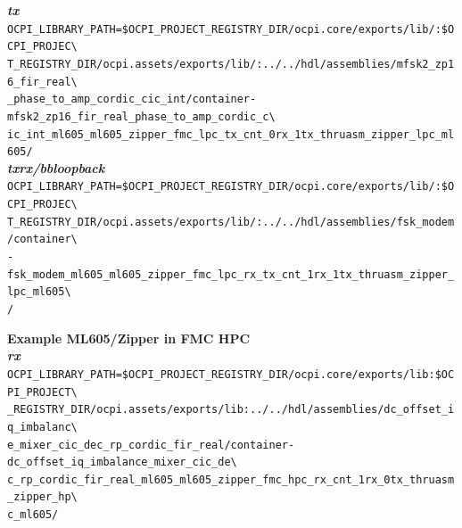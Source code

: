 \noindent\textbf{\textit{tx}}\\
\verb|OCPI_LIBRARY_PATH=$OCPI_PROJECT_REGISTRY_DIR/ocpi.core/exports/lib/:$OCPI_PROJEC\| \\
\verb|T_REGISTRY_DIR/ocpi.assets/exports/lib/:../../hdl/assemblies/mfsk2_zp16_fir_real\| \\
\verb|_phase_to_amp_cordic_cic_int/container-mfsk2_zp16_fir_real_phase_to_amp_cordic_c\| \\
\verb|ic_int_ml605_ml605_zipper_fmc_lpc_tx_cnt_0rx_1tx_thruasm_zipper_lpc_ml605/| \\

\noindent\textbf{\textit{txrx/bbloopback}}\\
\verb|OCPI_LIBRARY_PATH=$OCPI_PROJECT_REGISTRY_DIR/ocpi.core/exports/lib/:$OCPI_PROJEC\| \\
\verb|T_REGISTRY_DIR/ocpi.assets/exports/lib/:../../hdl/assemblies/fsk_modem/container\| \\
\verb|-fsk_modem_ml605_ml605_zipper_fmc_lpc_rx_tx_cnt_1rx_1tx_thruasm_zipper_lpc_ml605\| \\
\verb|/| \\
\par\medskip

\noindent\textbf{Example ML605/Zipper in FMC HPC}\\
\noindent\textbf{\textit{rx}}\\
\verb|OCPI_LIBRARY_PATH=$OCPI_PROJECT_REGISTRY_DIR/ocpi.core/exports/lib:$OCPI_PROJECT\| \\
\verb|_REGISTRY_DIR/ocpi.assets/exports/lib:../../hdl/assemblies/dc_offset_iq_imbalanc\| \\
\verb|e_mixer_cic_dec_rp_cordic_fir_real/container-dc_offset_iq_imbalance_mixer_cic_de\| \\
\verb|c_rp_cordic_fir_real_ml605_ml605_zipper_fmc_hpc_rx_cnt_1rx_0tx_thruasm_zipper_hp\| \\
\verb|c_ml605/| \\

